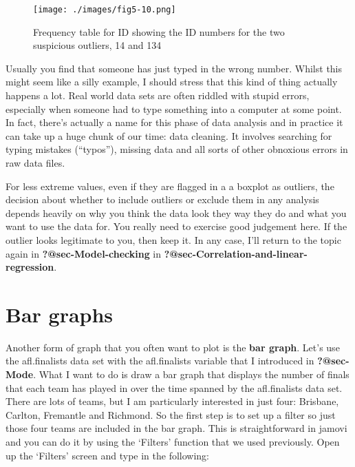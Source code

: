 \documentclass[
  letterpaper,
]{book}
\begin{document}
\begin{figure}

\texttt{[image: ./images/fig5-10.png]} \hfill{}

\caption{\label{fig-fig5-10}Frequency table for ID showing the ID
numbers for the two suspicious outliers, 14 and 134}

\end{figure}

Usually you find that someone has just typed in the wrong number. Whilst
this might seem like a silly example, I should stress that this kind of
thing actually happens a lot. Real world data sets are often riddled
with stupid errors, especially when someone had to type something into a
computer at some point. In fact, there's actually a name for this phase
of data analysis and in practice it can take up a huge chunk of our
time: data cleaning. It involves searching for typing mistakes
(``typos''), missing data and all sorts of other obnoxious errors in raw
data files.

For less extreme values, even if they are flagged in a a boxplot as
outliers, the decision about whether to include outliers or exclude them
in any analysis depends heavily on why you think the data look they way
they do and what you want to use the data for. You really need to
exercise good judgement here. If the outlier looks legitimate to you,
then keep it. In any case, I'll return to the topic again in
\textbf{?@sec-Model-checking} in
\textbf{?@sec-Correlation-and-linear-regression}.

\hypertarget{sec-Bar-graphs}{%
\section{Bar graphs}\label{sec-Bar-graphs}}

Another form of graph that you often want to plot is the \textbf{bar
graph}. Let's use the afl.finalists data set with the afl.finalists
variable that I introduced in \textbf{?@sec-Mode}. What I want to do is
draw a bar graph that displays the number of finals that each team has
played in over the time spanned by the afl.finalists data set. There are
lots of teams, but I am particularly interested in just four: Brisbane,
Carlton, Fremantle and Richmond. So the first step is to set up a filter
so just those four teams are included in the bar graph. This is
straightforward in jamovi and you can do it by using the `Filters'
function that we used previously. Open up the `Filters' screen and type
in the following:
\end{document}

